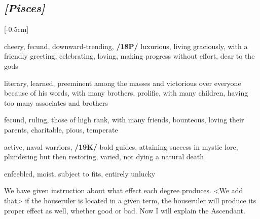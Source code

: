 \subsection{\textit{[Pisces]}}
\marginnote{\Pisces}[-0.5cm]
\vspace{-1mm}
\begin{description}[labelindent=0em , labelwidth=1em, labelsep=1em, leftmargin =!]
\item[\Venus]
	[0-11] cheery, fecund, downward-trending, \textbf{/18P/} luxurious, living graciously, with a friendly greeting, celebrating, loving, making progress without effort, dear to the gods
\item[\Jupiter]
	[12-15] literary, learned, preeminent among the masses and victorious over everyone because of his words, with many brothers, prolific, with many children, having too many associates and brothers	
\item[\Mercury]
	[16-18] fecund, ruling, those of high rank, with many friends, bounteous, loving their parents, charitable, pious, temperate	
\item[\Mars]
	[19-27] active, naval warriors, \textbf{/19K/} bold guides, attaining success in mystic lore, plundering but then restoring, varied, not dying a natural death	
\item[\Saturn]
	[28-29] enfeebled, moist, subject to fits, entirely unlucky	
\end{description}

\mndl[0.2cm]
We have given instruction about what effect each degree produces. <We add that> if the houseruler is located in a given term, the houseruler will produce its proper effect as well, whether good or bad. Now I will explain the Ascendant.
\newpage